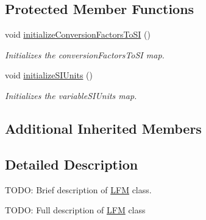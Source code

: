 \subsection*{Protected Member Functions}
\begin{DoxyCompactItemize}
\item 
void \hyperlink{classccmc_1_1_l_f_m_a575ca8f71a149babc45fe840fbf66daf}{initialize\-Conversion\-Factors\-To\-S\-I} ()
\begin{DoxyCompactList}\small\item\em Initializes the conversion\-Factors\-To\-S\-I map. \end{DoxyCompactList}\item 
void \hyperlink{classccmc_1_1_l_f_m_ab82dc1add65cfa4c40bff916129c4a41}{initialize\-S\-I\-Units} ()
\begin{DoxyCompactList}\small\item\em Initializes the variable\-S\-I\-Units map. \end{DoxyCompactList}\end{DoxyCompactItemize}
\subsection*{Additional Inherited Members}


\subsection{Detailed Description}
T\-O\-D\-O\-: Brief description of \hyperlink{classccmc_1_1_l_f_m}{L\-F\-M} class. 

T\-O\-D\-O\-: Full description of \hyperlink{classccmc_1_1_l_f_m}{L\-F\-M} class 

